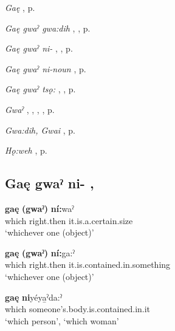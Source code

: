 \begin{CayugaRelated}
\item \textit{Gaę} , p. \pageref{p:[gaę-]}\\
\item \textit{Gaę gwaˀ gwa:dih} , , p. \pageref{p:[gaę gwaˀ gwa:dih]}\\
\item \textit{Gaę gwaˀ ni-} , , p. \pageref{p:[gaę gwaˀ ni- ]}\\
\item \textit{Gaę gwaˀ ni-noun} , p. \pageref{p:[gaę gwaˀ ni-noun]}\\
\item \textit{Gaę gwaˀ tsǫ:} , , p. \pageref{p:[gaę gwaˀ tsǫ:]}\\
\item \textit{Gwaˀ} , , , , p. \pageref{p:[gwaˀ] ‘immediately’}\\
\item \textit{Gwa:dih, Gwai} , p. \pageref{p:[gwa:dih]}\\
\item \textit{Hǫ:weh} , p. \pageref{p:[hǫ:weh]}
\end{CayugaRelated}

\subsection*{\textbf{Gaę gwaˀ ni-} , } \label{p:[gaę gwaˀ ni- ]}

\ea
\label{ex:gpart14}
\gll \textbf{gaę} \textbf{(gwaˀ)} \textbf{ní:}waˀ\\
which right.then it.is.a.certain.size\\
\glt ‘whichever one (object)’
\z

\ea
\label{ex:gpart15}
\gll \textbf{gaę} \textbf{(gwaˀ)} \textbf{ní:}ga:ˀ\\
which right.then it.is.contained.in.something\\
\glt ‘whichever one (object)’
\z

\ea
\label{ex:gpart16}
\gll \textbf{gaę} \textbf{ni}yéya̱ˀda:ˀ\\
which someone’s.body.is.contained.in.it\\
\glt ‘which person’, ‘which woman’
\z

